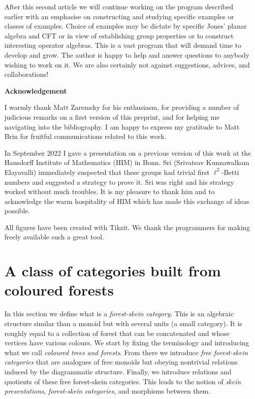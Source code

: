 \documentclass[a4paper, 12pt]{amsart}
\numberwithin{equation}{section}
\theoremstyle{definition}
\begin{document}
After this second article we will continue working on the program described earlier with an emphasise on constructing and studying specific examples or classes of examples. 
Choice of examples may be dictate by specific Jones' planar algebra and CFT or in view of establishing group properties or to construct interesting operator algebras.
This is a vast program that will demand time to develop and grow.
The author is happy to help and answer questions to anybody wishing to work on it.
We are also certainly not against suggestions, advices, and collaborations!

\begin{center}\begin{large}{\bf Acknowledgement}\end{large}\end{center}
I warmly thank Matt Zaremsky for his enthusiasm, for providing a number of judicious remarks on a first version of this preprint, and for helping me navigating into the bibliography.
I am happy to express my gratitude to Matt Brin for fruitful communications related to this work.

In September 2022 I gave a presentation on a previous version of this work at the Hausdorff Institute of Mathematics (HIM) in Bonn. Sri (Srivatsav Kunnawalkam Elayavalli) immediately suspected that these groups had trivial first $\ell^2$-Betti numbers and suggested a strategy to prove it. Sri was right and his strategy worked without much troubles. It is my pleasure to thank him and to acknowledge the warm hospitality of HIM which has made this exchange of ideas possible.

All figures have been created with Tikzit. We thank the programmers for making freely available such a great tool.


\section{A class of categories built from coloured forests}\label{sec:formalism}

In this section we define what is a {\it forest-skein category}. This is an algebraic structure similar than a monoid but with several units (a small category). It is roughly equal to a collection of forest that can be concatenated and whose vertices have various colours. 
We start by fixing the terminology and introducing what we call {\it coloured trees and forests}.
From there we introduce {\it free forest-skein categories} that are analogues of free monoids but obeying nontrivial relations induced by the diagrammatic structure.
Finally, we introduce relations and quotients of these free forest-skein categories. This leads to the notion of {\it skein presentations}, {\it forest-skein categories}, and morphisms between them.
\end{document}
